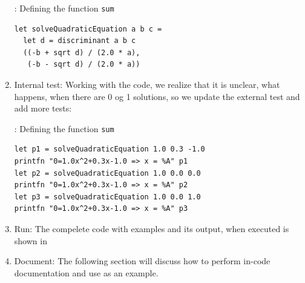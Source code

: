 \documentclass[fsharpNotes.tex]{subfiles}
\begin{document}
\begin{enumerate}
\begin{codeNOutput}[label=solveQuadraticEquationImplementation,
  top=-5pt,
  bottom=-5pt,
  left=-2pt,
  right=-2pt,
]{: Defining the function \lstinline{sum}}
\begin{lstlisting}
let solveQuadraticEquation a b c =
  let d = discriminant a b c
  ((-b + sqrt d) / (2.0 * a),
   (-b - sqrt d) / (2.0 * a))
\end{lstlisting}
\end{codeNOutput}
\item Internal test: Working with the code, we realize that it is unclear, what happens, when there are 0 og 1 solutions, so we update the external test and add more tests:
\begin{codeNOutput}[label=solveQuadraticEquationTest,
  top=-5pt,
  bottom=-5pt,
  left=-2pt,
  right=-2pt,
]{: Defining the function \lstinline{sum}}
\begin{lstlisting}
let p1 = solveQuadraticEquation 1.0 0.3 -1.0
printfn "0=1.0x^2+0.3x-1.0 => x = %A" p1
let p2 = solveQuadraticEquation 1.0 0.0 0.0
printfn "0=1.0x^2+0.3x-1.0 => x = %A" p2
let p3 = solveQuadraticEquation 1.0 0.0 1.0
printfn "0=1.0x^2+0.3x-1.0 => x = %A" p3
\end{lstlisting} 
\end{codeNOutput}
\item Run: The compelete code with examples and its output, when executed is shown in 
\item Document: The following section will discuss how to perform in-code documentation and use  as an example.
\end{enumerate}
\end{document}
